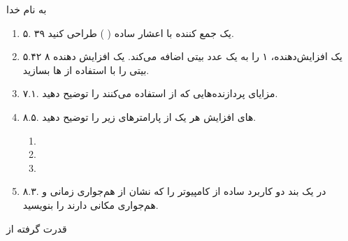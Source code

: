 \documentclass{article}[12pt]
\begin{document}
\begin{centering}
به نام خدا\\
\end{centering}
\begin{enumerate}
\item
۵. ۳۹
یک جمع کننده با اعشار ساده (
) طراحی کنید.

\item
۵.۴۲
یک افزایش‌دهنده، ۱ را به یک عدد
 بیتی اضافه می‌کند. یک افزایش دهنده ۸ بیتی را با استفاده از 
ها بسازید.

\item 
۷.۱.
مزایای پردازنده‌هایی که از 
استفاده می‌کنند را توضیح دهید.
\item
{}
۸.۵.
های افزایش هر یک از پارامترهای زیر را توضیح دهید.
\begin{enumerate}
\item
{}
\item
{}
\item
{}
\end{enumerate}

\item
۸.۳.
در یک بند دو کاربرد ساده از کامپیوتر را که نشان از هم‌جواری زمانی و هم‌جواری مکانی دارند را بنویسید.

\end{enumerate}
\begin{centering}
قدرت گرفته از \lr{\LaTeX}

\end{centering}
\end{document}
